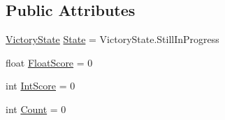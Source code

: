 \subsection*{Public Attributes}
\begin{DoxyCompactItemize}
\item 
\hyperlink{classgearit_1_1src_1_1game_1_1_score_a48f48fc89bbc2f4e7009a8a31e0dd700}{Victory\+State} \hyperlink{classgearit_1_1src_1_1game_1_1_score_a3753daefe8606c4c5d8b2baa4b773218}{State} = Victory\+State.\+Still\+In\+Progress
\item 
float \hyperlink{classgearit_1_1src_1_1game_1_1_score_a053a9a27c6751a9cb1aeb0aad52cbee5}{Float\+Score} = 0
\item 
int \hyperlink{classgearit_1_1src_1_1game_1_1_score_a5637f26e62cfb82faa0da93cc79afded}{Int\+Score} = 0
\item 
int \hyperlink{classgearit_1_1src_1_1game_1_1_score_af68b443883a7545b7dd18c4242e3992b}{Count} = 0
\end{DoxyCompactItemize}


